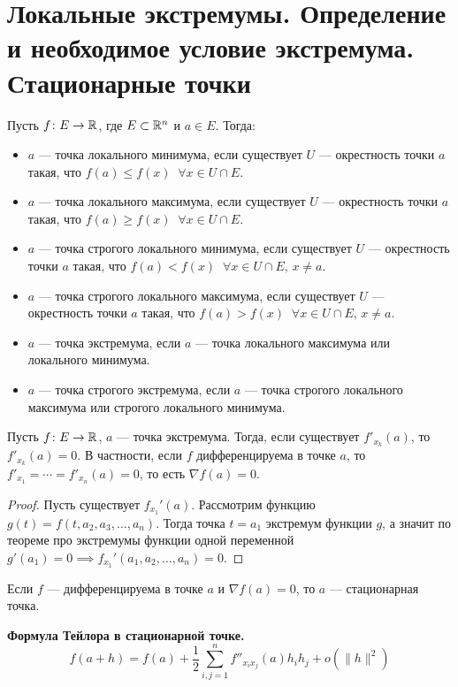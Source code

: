 \section{Локальные экстремумы. Определение и необходимое условие экстремума. Стационарные точки}
\begin{conj}
Пусть $f\colon E \to \mathbb{R}$, где $E \subset \mathbb{R}^n$ и $a \in E$. Тогда:
\begin{itemize}
    \item $a$ --- точка локального минимума, если существует $U$ --- окрестность точки $a$ такая, что $f(a) \leqslant f(x) \;\; \forall x \in U \cap E$.
    \item $a$ --- точка локального максимума, если существует $U$ --- окрестность точки $a$ такая, что $f(a) \geqslant f(x) \;\; \forall x \in U \cap E$.
    \item $a$ --- точка строгого локального минимума, если существует $U$ --- окрестность точки $a$ такая, что $f(a) < f(x) \;\; \forall x \in U \cap E,\, x \neq a$.
    \item $a$ --- точка строгого локального максимума, если существует $U$ --- окрестность точки $a$ такая, что $f(a) > f(x) \;\; \forall x \in U \cap E,\, x \neq a$.
    \item $a$ --- точка экстремума, если $a$ --- точка локального максимума или локального минимума.
    \item $a$ --- точка строгого экстремума, если $a$ --- точка строгого локального максимума или строгого локального минимума.
\end{itemize}
\end{conj}

\begin{theorem}
Пусть $f\colon E \to \mathbb{R}$, $a$ --- точка экстремума. Тогда, если существует $f'_{x_k}(a)$, то $f'_{x_k}(a) = 0$. В частности, если $f$ дифференцируема в точке $a$, то $f'_{x_1} = \dotsb = f'_{x_n}(a) = 0$, то есть $\nabla  f(a) = 0$.
\end{theorem}
\begin{proof}
Пусть существует $f_{x_1}'(a)$. Рассмотрим функцию $g(t) = f(t, a_2, a_3, \dotsc, a_n)$. Тогда точка $t = a_1$ экстремум функции $g$, а значит по теореме про экстремумы функции одной переменной $g'(a_1) = 0 \implies f_{x_1}'(a_1, a_2, \dotsc, a_n) = 0$.
\end{proof}

\begin{conj}
Если $f$ --- дифференцируема в точке $a$ и $\nabla f(a) = 0$, то $a$ --- стационарная точка.
\end{conj}

\textbf{Формула Тейлора в стационарной точке.}
\begin{equation*}
f(a + h) = f(a) + \frac{1}{2} \sum\limits_{i, j = 1}^{n} f''_{x_i x_j}(a) h_i h_j + o(\| h \|^2)
\end{equation*}